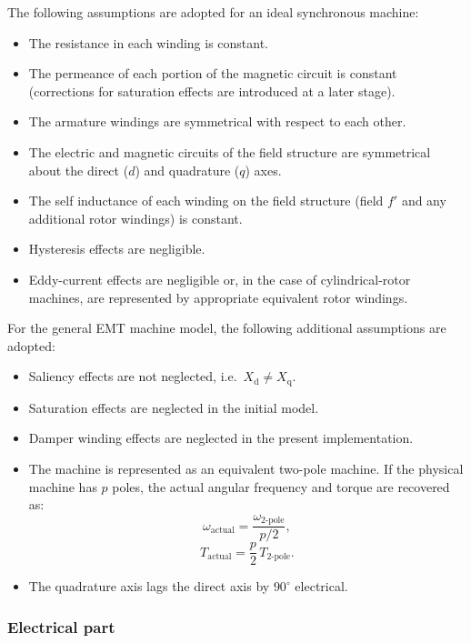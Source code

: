 The following assumptions are adopted for an ideal synchronous machine:
\begin{itemize}
    \item The resistance in each winding is constant.
    \item The permeance of each portion of the magnetic circuit is constant (corrections for saturation effects are introduced at a later stage).
    \item The armature windings are symmetrical with respect to each other.
    \item The electric and magnetic circuits of the field structure are symmetrical about the direct ($d$) and quadrature ($q$) axes.
    \item The self inductance of each winding on the field structure (field $f'$ and any additional rotor windings) is constant.
    \item Hysteresis effects are negligible.
    \item Eddy-current effects are negligible or, in the case of cylindrical-rotor machines, are represented by appropriate equivalent rotor windings.
\end{itemize}

For the general EMT machine model, the following additional assumptions are adopted:
\begin{itemize}
    \item Saliency effects are not neglected, i.e.\ $X_\text{d} \neq X_\text{q}$.
    \item Saturation effects are neglected in the initial model.
    \item Damper winding effects are neglected in the present implementation.
    \item The machine is represented as an equivalent two-pole machine. If the physical machine has $p$ poles, the actual angular frequency and torque are recovered as:
    \begin{equation}
        \omega_{\text{actual}} = \frac{\omega_{\text{2-pole}}}{p/2},
    \end{equation}
    \begin{equation}
        T_{\text{actual}} = \frac{p}{2} \, T_{\text{2-pole}}.
    \end{equation}
    \item The quadrature axis lags the direct axis by $90^{\circ}$ electrical.
\end{itemize}

\subsubsection{Electrical part}

